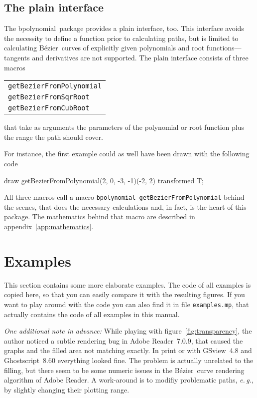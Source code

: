 \documentclass{article}
\newcommand*{\cmd}[1]{\texttt{#1}}
\newcommand*{\name}[1]{\textsf{#1}}
\newcommand*{\pkg}{\name{bpolynomial}}
\newcommand*{\B}{B\'ezier}
\begin{document}
\subsection{The plain interface}\label{sec:plaininterface}
The \pkg\ package provides a plain interface, too.  This interface avoids the necessity to define a function prior to calculating paths, but is limited to calculating \B\ curves of explicitly given polynomials and root functions---tangents and derivatives are not supported.  The plain interface consists of three macros
\begin{center}
  \begin{tabular}{l}
    \cmd{getBezierFromPolynomial} \\
    \cmd{getBezierFromSqrRoot} \\
    \cmd{getBezierFromCubRoot} \\
  \end{tabular}
\end{center}
that take as arguments the parameters of the polynomial or root function plus the range the path should cover.

For instance, the first example could as well have been drawn with the following code
\begin{listing}
  draw getBezierFromPolynomial(2, 0, -3, -1)(-2, 2) transformed T;
\end{listing}

All three macros call a macro \verb+bpolynomial_getBezierFromPolynomial+ behind the scenes, that does the necessary calculations and, in fact, is the heart of this package.  The mathematics behind that macro are described in appendix~\ref{app:mathematics}.


\section{Examples}\label{sec:examples}
This section contains some more elaborate examples.  The code of all examples is copied here, so that you can easily compare it with the resulting figures.  If you want to play around with the code you can also find it in file \cmd{examples.mp}, that actually contains the code of all examples in this manual.

\emph{One additional note in advance:}  While playing with figure~\ref{fig:transparency}, the author noticed a subtle rendering bug in Adobe Reader~7.0.9, that caused the graphs and the filled area not matching exactly.  In print or with GSview~4.8 and Ghostscript~8.60 everything looked fine.  The problem is actually unrelated to the filling, but there seem to be some numeric issues in the \B\ curve rendering algorithm of Adobe Reader.  A work-around is to modifiy problematic paths, \emph{e.\,g.}, by slightly changing their plotting range.
\end{document}
